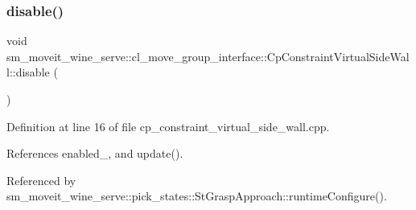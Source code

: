 \subsubsection{\texorpdfstring{disable()}{disable()}\hspace{0.1cm}{\footnotesize\ttfamily [2/2]}}
{\footnotesize\ttfamily void sm\+\_\+moveit\+\_\+wine\+\_\+serve\+::cl\+\_\+move\+\_\+group\+\_\+interface\+::\+Cp\+Constraint\+Virtual\+Side\+Wall\+::disable (\begin{DoxyParamCaption}{ }\end{DoxyParamCaption})}



Definition at line 16 of file cp\+\_\+constraint\+\_\+virtual\+\_\+side\+\_\+wall.\+cpp.



References enabled\+\_\+, and update().



Referenced by sm\+\_\+moveit\+\_\+wine\+\_\+serve\+::pick\+\_\+states\+::\+St\+Grasp\+Approach\+::runtime\+Configure().


